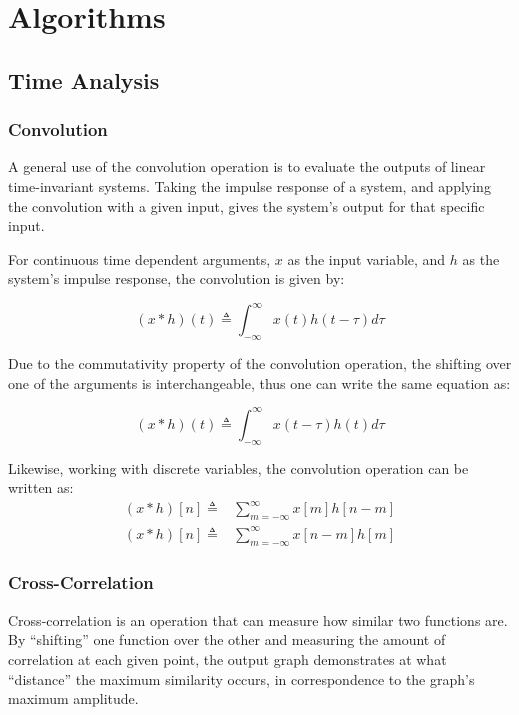 

\chapter{Algorithms}
\section{Time Analysis}
\subsection{Convolution}
A general use of the convolution operation
is to evaluate the outputs of linear
time-invariant systems.
Taking the impulse response of a system, and
applying the convolution with
a given input, gives the system's output
for that specific input.

For continuous time dependent arguments,
\(x\) as the input variable, and \(h\) as the
system's impulse response, the convolution is given by:

\begin{equation}
    (x * h)(t) \triangleq \int^{\infty}_{-\infty} x(t)h(t-\tau) d\tau
\end{equation}

Due to the commutativity property of the convolution
operation, the shifting over one of the arguments
is interchangeable, thus one can write
the same equation as:

\begin{equation}
    (x * h)(t) \triangleq \int^{\infty}_{-\infty} x(t-\tau)h(t) d\tau
\end{equation}

Likewise, working with discrete variables,
the convolution operation can be written as:
\begin{align}
    (x * h)[n] \triangleq & \sum^{\infty}_{m=-\infty} x[m]h[n-m] \\
    (x * h)[n] \triangleq & \sum^{\infty}_{m=-\infty} x[n-m]h[m]
\end{align}


\subsection{Cross-Correlation}
Cross-correlation is an operation that can measure
how similar two functions are. By ``shifting''
one function over the other and measuring the amount
of correlation at each given point, the output graph
demonstrates at what ``distance''
the maximum similarity occurs,
in correspondence
to the graph's maximum amplitude.

